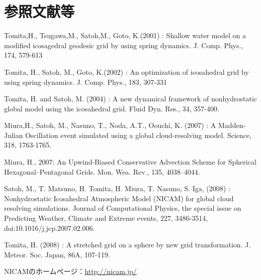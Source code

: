 \section{参照文献等}


Tomita,H., Tsugawa,M., Satoh,M., Goto, K.(2001) : Shallow water model on a modified icosagedral geodesic grid by using spring dynamics. J. Comp. Phys., 174, 579-613

Tomita, H., Satoh, M., Goto, K.(2002) : An optimization of icosahedral grid by using spring dynamics. J. Comp. Phys., 183, 307-331

Tomita, H. and Satoh, M. (2004) : A new dynamical framework of nonhydrostatic global model using the icosahedral grid. Fluid Dyn. Res., 34, 357-400.

Miura,H., Satoh, M., Nasuno, T., Noda, A.T., Oouchi, K. (2007) : A Madden-Julian Oscillation event simulated using a global cloud-resolving model. Science, 318, 1763-1765.

Miura, H., 2007: An Upwind-Biased Conservative Advection Scheme for Spherical Hexagonal–Pentagonal Grids. Mon. Wea. Rev., 135, 4038–4044.

Satoh, M., T. Matsuno, H. Tomita, H. Miura, T. Nasuno, S. Iga, (2008) : Nonhydrostatic Icosahedral Atmospheric Model (NICAM) for global cloud resolving simulations. Journal of Computational Physics, the special issue on Predicting Weather, Climate and Extreme events, 227, 3486-3514, doi:10.1016/j.jcp.2007.02.006.

Tomita, H. (2008) : A stretched grid on a sphere by new grid transformation. J. Meteor. Soc. Japan, 86A, 107-119.

NICAMのホームページ：\url{http://nicam.jp/}
